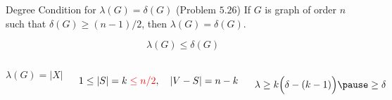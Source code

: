 
\begin{frame}
  \begin{exampleblock}{Degree Condition for $\lambda(G) = \delta(G)$ (Problem $5.26$)}
    If $G$ is graph of order $n$ such that $\delta(G) \ge (n-1)/2$, then $\lambda(G) = \delta(G)$.
  \end{exampleblock}

  \pause
  \[
    \lambda(G) \le \delta(G)
  \]

  \begin{center}
  \end{center}

  \pause
  \begin{columns}
      \[
	\lambda(G) = |X|
      \]

      \pause
      \vspace{-0.50cm}
      \[
	1 \le |S| = k \;\textcolor{red}{\le n/2}, \quad |V - S| = n - k
      \]

      \pause
      \vspace{-0.50cm}
      \[
	\lambda \ge k \Big(\delta - (k - 1) \Big) \pause \ge \delta
      \]
  \end{columns}
\end{frame}

\begin{frame}
\end{frame}
